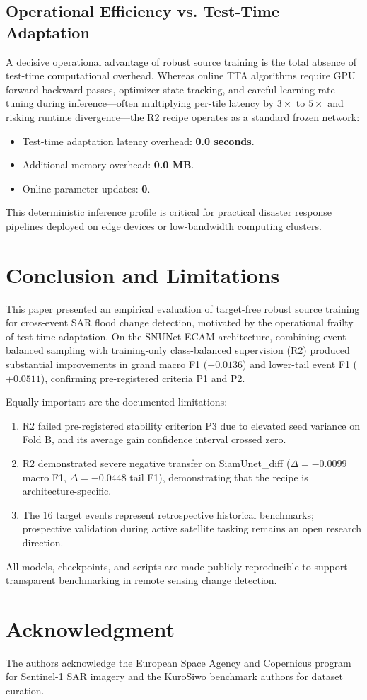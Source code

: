 \documentclass[conference]{IEEEtran}
\begin{document}
\subsection{Operational Efficiency vs. Test-Time Adaptation}
A decisive operational advantage of robust source training is the total absence of test-time computational overhead. Whereas online TTA algorithms require GPU forward-backward passes, optimizer state tracking, and careful learning rate tuning during inference—often multiplying per-tile latency by $3\times$ to $5\times$ and risking runtime divergence—the R2 recipe operates as a standard frozen network:
\begin{itemize}
    \item Test-time adaptation latency overhead: \textbf{0.0 seconds}.
    \item Additional memory overhead: \textbf{0.0 MB}.
    \item Online parameter updates: \textbf{0}.
\end{itemize}
This deterministic inference profile is critical for practical disaster response pipelines deployed on edge devices or low-bandwidth computing clusters.

\section{Conclusion and Limitations}
This paper presented an empirical evaluation of target-free robust source training for cross-event SAR flood change detection, motivated by the operational frailty of test-time adaptation. On the SNUNet-ECAM architecture, combining event-balanced sampling with training-only class-balanced supervision (R2) produced substantial improvements in grand macro F1 ($+0.0136$) and lower-tail event F1 ($+0.0511$), confirming pre-registered criteria P1 and P2.

Equally important are the documented limitations:
\begin{enumerate}
    \item R2 failed pre-registered stability criterion P3 due to elevated seed variance on Fold B, and its average gain confidence interval crossed zero.
    \item R2 demonstrated severe negative transfer on SiamUnet\_diff ($\Delta = -0.0099$ macro F1, $\Delta = -0.0448$ tail F1), demonstrating that the recipe is architecture-specific.
    \item The 16 target events represent retrospective historical benchmarks; prospective validation during active satellite tasking remains an open research direction.
\end{enumerate}
All models, checkpoints, and scripts are made publicly reproducible to support transparent benchmarking in remote sensing change detection.

\section*{Acknowledgment}
The authors acknowledge the European Space Agency and Copernicus program for Sentinel-1 SAR imagery and the KuroSiwo benchmark authors for dataset curation.



\end{document}
